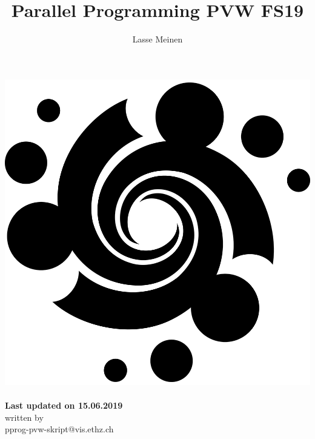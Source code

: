 \documentclass[titlepage, dvipsnames]{article}
\title{Parallel Programming PVW FS19}
\author{Lasse Meinen}
\theoremstyle{plain}
\theoremstyle{remark}
\theoremstyle{definition}
\begin{document}
    \renewcommand{\figurename}{Fig.}
    \renewcommand{\contentsname}{Table of Contents}
    \renewcommand{\thesubfigure}{\roman{subfigure}}
    
    \renewcommand{\ExerciseHeaderTitle}{\ExerciseTitle}
    \renewcommand{\ExerciseHeader}{\centerline{\textbf{\large\ExerciseName\ExerciseHeaderNB\ExerciseHeaderTitle\ExerciseHeaderOrigin}}\\}
    \renewcommand{\ExerciseListHeader}{\ExerciseHeaderDifficulty%
    \textbf{\ExerciseHeaderNB .%
    \ \ExerciseHeaderTitle \newline}%
    \ExerciseHeaderOrigin\ignorespaces}
    \renewcommand{\AnswerListHeader}{\textbf{\ExerciseHeaderNB. \ \ExerciseHeaderTitle}}
    \setlength{\Exesep}{1\baselineskip}    
    \setlength{\QuestionBefore}{.2em}
    \setlength{\QuestionIndent}{2em}
    
    \makeatletter 
    \begin{titlepage}
        \begin{center}
            \includegraphics[width=0.7\linewidth]{spirale_black1000x1000.png}\\[4ex]
            \huge \textbf{\@title} \\[2ex] 
            \Large \textbf{Last updated on 15.06.2019} \\[2ex]
            \large written by \@author\\[2ex] 
            \large pprog-pvw-skript@vis.ethz.ch \\[50ex]
        \end{center}
    \end{titlepage}
    \makeatother
    \thispagestyle{empty}
    \newpage

    
    \newpage
    
    \setcounter{page}{1} %
    
    \tableofcontents
    \newpage
    
    \newpage
    
    \newpage
    
    \newpage
    
    \newpage
\end{document}

